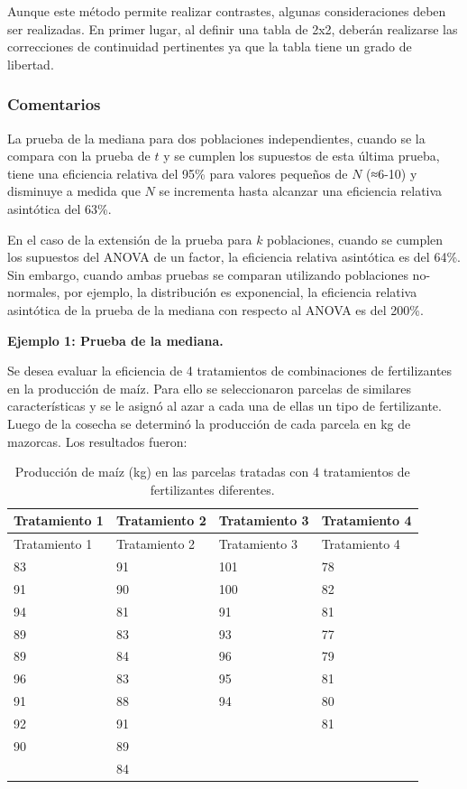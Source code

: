 \documentclass[]{book}
\theoremstyle{definition}
\theoremstyle{definition}
\theoremstyle{definition}
\theoremstyle{remark}
\begin{document}
Aunque este método permite realizar contrastes, algunas consideraciones
deben ser realizadas. En primer lugar, al definir una tabla de 2x2,
deberán realizarse las correcciones de continuidad pertinentes ya que la
tabla tiene un grado de libertad.

\hypertarget{comentarios-2}{%
\subsubsection{Comentarios}\label{comentarios-2}}

La prueba de la mediana para dos poblaciones independientes, cuando se
la compara con la prueba de \(t\) y se cumplen los supuestos de esta
última prueba, tiene una eficiencia relativa del 95\% para valores
pequeños de \(N\) (≈6-10) y disminuye a medida que \(N\) se incrementa
hasta alcanzar una eficiencia relativa asintótica del 63\%.

En el caso de la extensión de la prueba para \(k\) poblaciones, cuando
se cumplen los supuestos del ANOVA de un factor, la eficiencia relativa
asintótica es del 64\%. Sin embargo, cuando ambas pruebas se comparan
utilizando poblaciones no-normales, por ejemplo, la distribución es
exponencial, la eficiencia relativa asintótica de la prueba de la
mediana con respecto al ANOVA es del 200\%.

\textbf{Ejemplo 1: Prueba de la mediana. }

Se desea evaluar la eficiencia de 4 tratamientos de combinaciones de
fertilizantes en la producción de maíz. Para ello se seleccionaron
parcelas de similares características y se le asignó al azar a cada una
de ellas un tipo de fertilizante. Luego de la cosecha se determinó la
producción de cada parcela en kg de mazorcas. Los resultados fueron:

\begin{longtable}[]{@{}llll@{}}
\caption{\label{tab:ejemplo-mediana} Producción de maíz (kg) en las parcelas
tratadas con 4 tratamientos de fertilizantes diferentes.}\tabularnewline
\toprule
Tratamiento 1 & Tratamiento 2 & Tratamiento 3 & Tratamiento
4\tabularnewline
\midrule
\endfirsthead
\toprule
Tratamiento 1 & Tratamiento 2 & Tratamiento 3 & Tratamiento
4\tabularnewline
\midrule
\endhead
83 & 91 & 101 & 78\tabularnewline
91 & 90 & 100 & 82\tabularnewline
94 & 81 & 91 & 81\tabularnewline
89 & 83 & 93 & 77\tabularnewline
89 & 84 & 96 & 79\tabularnewline
96 & 83 & 95 & 81\tabularnewline
91 & 88 & 94 & 80\tabularnewline
92 & 91 & & 81\tabularnewline
90 & 89 & &\tabularnewline
& 84 & &\tabularnewline
\bottomrule
\end{longtable}
\end{document}
